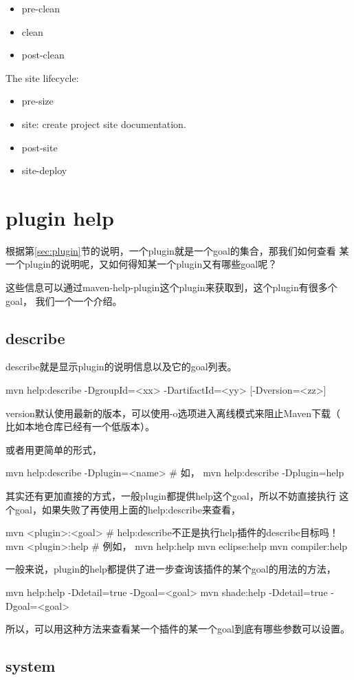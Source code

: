 \documentclass[a4paper,11pt]{article}
\begin{document}
\begin{itemize}
\item pre-clean
\item clean
\item post-clean
\end{itemize}

The site lifecycle:
\begin{itemize}
\item pre-size
\item site: create project site documentation.
\item post-site
\item site-deploy
\end{itemize}


\section[plugin help]{plugin help}
根据第\ref{sec:plugin}节的说明，一个plugin就是一个goal的集合，那我们如何查看
某一个plugin的说明呢，又如何得知某一个plugin又有哪些goal呢？

这些信息可以通过maven-help-plugin这个plugin来获取到，这个plugin有很多个goal，
我们一个一个介绍。

\subsection[describe]{describe}
describe就是显示plugin的说明信息以及它的goal列表。

\begin{bashcode}
  mvn help:describe -DgroupId=<xx> -DartifactId=<yy> [-Dversion=<zz>]
\end{bashcode}

version默认使用最新的版本，可以使用-o选项进入离线模式来阻止Maven下载（
比如本地仓库已经有一个低版本）。

或者用更简单的形式，

\begin{bashcode}
  mvn help:describe -Dplugin=<name>
  # 如，
  mvn help:describe -Dplugin=help
\end{bashcode}

其实还有更加直接的方式，一般plugin都提供help这个goal，所以不妨直接执行
这个goal，如果失败了再使用上面的help:describe来查看，

\begin{bashcode}
  mvn <plugin>:<goal>
  # help:describe不正是执行help插件的describe目标吗！
  mvn <plugin>:help
  # 例如，
  mvn help:help
  mvn eclipse:help
  mvn compiler:help
\end{bashcode}

一般来说，plugin的help都提供了进一步查询该插件的某个goal的用法的方法，

\begin{bashcode}
  mvn help:help -Ddetail=true -Dgoal=<goal>
  mvn shade:help -Ddetail=true -Dgoal=<goal>
\end{bashcode}

所以，可以用这种方法来查看某一个插件的某一个goal到底有哪些参数可以设置。

\subsection[system]{system}
\end{document}
